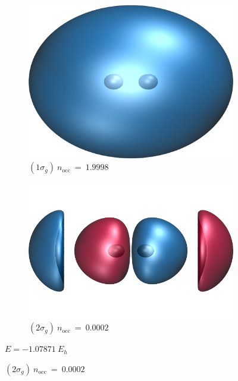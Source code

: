 \documentclass[aip,jcp,reprint,noshowkeys,superscriptaddress]{revtex4-1}
\begin{document}
\begin{figure}
  \begin{subfigure}[l]{0.45\linewidth}
    \includegraphics[width=0.75\linewidth]{Figures/h2_HF_mo1.cube.png}
    \caption*{\centering $(1\sigma_g)~n_\text{occ}~=~1.9998$}
  \end{subfigure}
  \begin{subfigure}[r]{0.45\linewidth}
    \includegraphics[width=0.75\linewidth]{Figures/h2_HF_mo4.cube.png}
    \caption*{\centering $(2\sigma_g)~n_\text{occ}~=~0.0002$}
  \end{subfigure}
  $E=-1.07871~E_h$
  

\end{figure}
\end{document}
